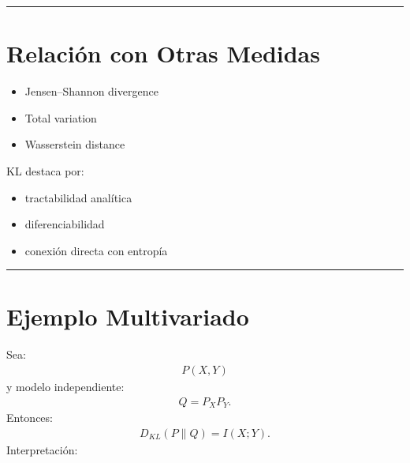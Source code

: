 \documentclass[letterpaper,10pt,english]{jupyterBook}
\begin{document}
\bigskip\hrule\bigskip



\section{Relación con Otras Medidas}
\label{\detokenize{02_mathematical_foundations/kl_divergence:relacion-con-otras-medidas}}\begin{itemize}
\item {} 
\sphinxAtStartPar
Jensen–Shannon divergence

\item {} 
\sphinxAtStartPar
Total variation

\item {} 
\sphinxAtStartPar
Wasserstein distance

\end{itemize}

\sphinxAtStartPar
KL destaca por:
\begin{itemize}
\item {} 
\sphinxAtStartPar
tractabilidad analítica

\item {} 
\sphinxAtStartPar
diferenciabilidad

\item {} 
\sphinxAtStartPar
conexión directa con entropía

\end{itemize}


\bigskip\hrule\bigskip



\section{Ejemplo Multivariado}
\label{\detokenize{02_mathematical_foundations/kl_divergence:ejemplo-multivariado}}
\sphinxAtStartPar
Sea:
\begin{equation*}
\begin{split}
P(X,Y)
\end{split}
\end{equation*}
\sphinxAtStartPar
y modelo independiente:
\begin{equation*}
\begin{split}
Q=P_XP_Y.
\end{split}
\end{equation*}
\sphinxAtStartPar
Entonces:
\begin{equation*}
\begin{split}
D_{KL}(P\|Q)=I(X;Y).
\end{split}
\end{equation*}
\sphinxAtStartPar
Interpretación:
\end{document}
